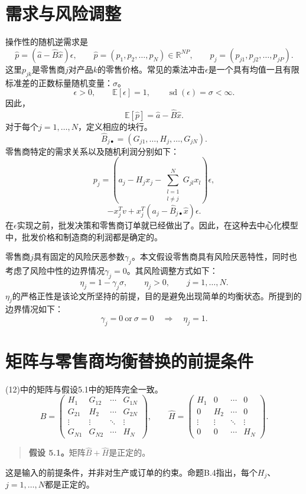 \documentclass{article}
\begin{document}
\section*{需求与风险调整}
操作性的随机逆需求是
\[
\hat{p}=(\hat{a}-\hat{B}\hat{x})\epsilon,
\qquad
\hat{p}=(p_1,p_2,\ldots,p_N)\in\mathbb{R}^{NP},
\qquad
p_j=(p_{j1},p_{j2},\ldots,p_{jP}).
\]
这里$p_{jk}$是零售商$j$对产品$k$的零售价格。常见的乘法冲击$\epsilon$是一个具有均值一且有限标准差的正数标量随机变量：$\sigma$。
\[
\epsilon>0,\qquad \mathbb{E}[\epsilon]=1,
\qquad \operatorname{sd}(\epsilon)=\sigma<\infty.
\]
因此，
\[
\mathbb{E}[\hat{p}]=\hat{a}-\hat{B}\hat{x}.
\]
对于每个$j=1,\ldots,N$，定义相应的块行。
\[
\hat{B}_{j\bullet}=(G_{j1},\ldots,H_j,\ldots,G_{jN}).
\]
零售商特定的需求关系以及随机利润分别如下：
\[
p_j=\left(a_j-H_jx_j-\sum_{\substack{l=1\\l\ne j}}^{N}G_{jl}x_l\right)\epsilon,
\]
\[
-x_j^T v+x_j^T(a_j-\hat{B}_{j\bullet}\hat{x})\epsilon.
\]
在$\epsilon$实现之前，批发决策和零售商订单就已经做出了。因此，在这种去中心化模型中，批发价格和制造商的利润都是确定的。

零售商$j$具有固定的风险厌恶参数$\gamma_j$。本文假设零售商具有风险厌恶特性，同时也考虑了风险中性的边界情况$\gamma_j=0$。其风险调整方式如下：
\[
\eta_j=1-\gamma_j\sigma,
\qquad \eta_j>0,
\qquad j=1,\ldots,N.
\]
$\eta_j$的严格正性是该论文所坚持的前提，目的是避免出现简单的均衡状态。所提到的边界情况如下：
\[
\gamma_j=0\ \text{or}\ \sigma=0
\quad\Longrightarrow\quad \eta_j=1.
\]

\section*{矩阵与零售商均衡替换的前提条件}
(12)中的矩阵与假设5.1中的矩阵完全一致。
\[
\hat{B}=
\begin{pmatrix}
H_1&G_{12}&\cdots&G_{1N}\\
G_{21}&H_2&\cdots&G_{2N}\\
\vdots&\vdots&\ddots&\vdots\\
G_{N1}&G_{N2}&\cdots&H_N
\end{pmatrix},
\qquad
\hat{H}=
\begin{pmatrix}
H_1&0&\cdots&0\\
0&H_2&\cdots&0\\
\vdots&\vdots&\ddots&\vdots\\
0&0&\cdots&H_N
\end{pmatrix}.
\]
\begin{quote}
\textbf{假设 5.1。}矩阵$\hat{B}+\hat{H}$是正定的。
\end{quote}
这是输入的前提条件，并非对生产或订单的约束。命题B.4指出，每个$H_j$、$j=1,\ldots,N$都是正定的。
\end{document}
